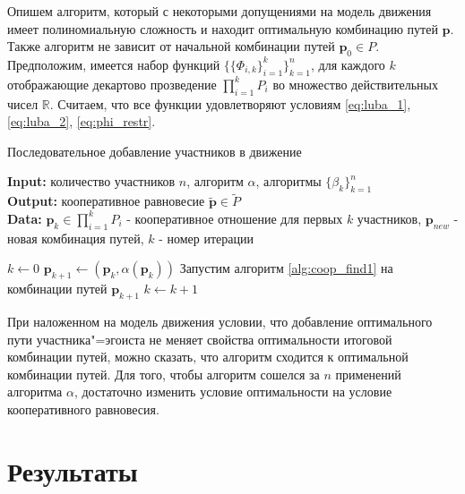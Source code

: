 \documentclass[12pt, a4paper]{article}
\begin{document}
Опишем алгоритм, который с некоторыми допущениями на модель движения имеет полиномиальную сложность и находит оптимальную комбинацию путей $\textbf{p}$.
Также алгоритм не зависит от начальной комбинации путей $\textbf{p}_0 \in P$. Предположим, имеется набор функций $\{\{\Phi_{i, k} \}_{i = 1}^k\}_{k = 1}^n$, для каждого $k$ отображающие декартово прозведение $\prod\limits_{i = 1}^kP_i$ во множество действительных чисел $\mathbb{R}$. Считаем, что все функции удовлетворяют условиям \eqref{eq:luba_1}, \eqref{eq:luba_2}, \eqref{eq:phi_restr}.


\begin{algorithm}[H]
	\caption{Последовательное добавление участников в движение}
	\label{alg:coop_find2}
	{\bf {Input:}} количество участников $n$, алгоритм $\alpha$, алгоритмы $\{\beta_k\}_{k = 1}^n$\\
	{\bf {Output:}} кооперативное равновесие $\widetilde{\textbf{p}} \in \widetilde{P}$\\
	{\bf {Data:}} $\textbf{p}_{k} \in \prod\limits_{i = 1}^kP_i$ - кооперативное отношение для первых $k$ участников, $\textbf{p}_{new}$ - новая комбинация путей, $k$ - номер итерации
	\begin{algorithmic}[1]
		\State $k \gets 0$
		\State $\textbf{p}_{k + 1} \gets (\textbf{p}_{k}, \alpha (\textbf{p}_{k}))$
		\State Запустим алгоритм \ref {alg:coop_find1} на комбинации путей $\textbf{p}_{k + 1}$
		\State $k \gets k + 1$
		\EndWhile
	\end{algorithmic}
\end{algorithm}

При наложенном на модель движения условии, что добавление оптимального пути участника"=эгоиста не меняет свойства оптимальности итоговой комбинации путей, можно сказать, что алгоритм сходится к оптимальной комбинации путей. Для того, чтобы алгоритм сошелся за $n$ применений алгоритма $\alpha$, достаточно изменить условие оптимальности на условие кооперативного равновесия.


\newpage
\section{Результаты}
\end{document}
